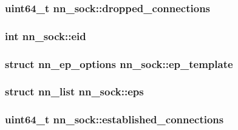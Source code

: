 \subsubsection[{dropped\+\_\+connections}]{\setlength{\rightskip}{0pt plus 5cm}uint64\+\_\+t nn\+\_\+sock\+::dropped\+\_\+connections}\hypertarget{structnn__sock_ac1165e1e66d693d44b95515288fede03}{}\label{structnn__sock_ac1165e1e66d693d44b95515288fede03}
\subsubsection[{eid}]{\setlength{\rightskip}{0pt plus 5cm}int nn\+\_\+sock\+::eid}\hypertarget{structnn__sock_a9560a8b4ac91cb913d2b914240e09ad9}{}\label{structnn__sock_a9560a8b4ac91cb913d2b914240e09ad9}
\subsubsection[{ep\+\_\+template}]{\setlength{\rightskip}{0pt plus 5cm}struct {\bf nn\+\_\+ep\+\_\+options} nn\+\_\+sock\+::ep\+\_\+template}\hypertarget{structnn__sock_a497b47e1188091bd4394ffc701ebc79e}{}\label{structnn__sock_a497b47e1188091bd4394ffc701ebc79e}
\subsubsection[{eps}]{\setlength{\rightskip}{0pt plus 5cm}struct {\bf nn\+\_\+list} nn\+\_\+sock\+::eps}\hypertarget{structnn__sock_aef79aa48a975a08a67e1735bf8102867}{}\label{structnn__sock_aef79aa48a975a08a67e1735bf8102867}
\subsubsection[{established\+\_\+connections}]{\setlength{\rightskip}{0pt plus 5cm}uint64\+\_\+t nn\+\_\+sock\+::established\+\_\+connections}\hypertarget{structnn__sock_afd96e7bdc461ec48cc0a86282e5a8472}{}\label{structnn__sock_afd96e7bdc461ec48cc0a86282e5a8472}
